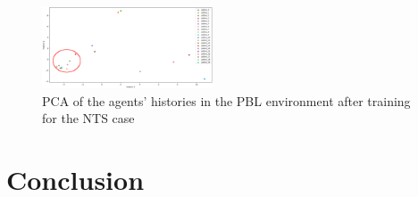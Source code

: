 \documentclass[doubleblind]{ecai}
\newcounter{relation}
\newcounter{proof}
\begin{document}
\begin{figure}[h!]
    \centering
    \includegraphics[width=0.45\textwidth]{figures/prahom_pca_analysis.png}
    \caption{PCA of the agents' histories in the PBL environment after training for the NTS case}
    \label{fig:prahom_pca_analysis}
\end{figure}


\section{Conclusion}




\end{document}
